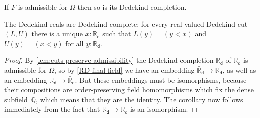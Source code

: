 \documentclass[10pt,a4paper]{article}
\providecommand{\index}[1]{}
\newcommand{\Q}{\ensuremath{\mathbb{Q}}\xspace}
\newcommand{\RD}{\ensuremath{\mathbb{R}_\mathsf{d}}\xspace} %
\newcommand{\barRD}{\ensuremath{\bar{\mathbb{R}}_\mathsf{d}}\xspace} %
\theoremstyle{definition}
\theoremstyle{remark}
\numberwithin{equation}{section}
\newcommand{\indexdef}[1]{\index{#1|defstyle}}   %
\begin{document}
\begin{lem} \label{lem:cuts-preserve-admissibility}
  If $F$ is admissible for $\Omega$ then so is its Dedekind completion.
  \index{completion!Dedekind}%
\end{lem}

\begin{cor} \label{RD-dedekind-complete}
  \indexdef{complete!ordered field, Dedekind}%
  \indexdef{Dedekind!completeness}%
  The Dedekind reals are Dedekind complete: for every real-valued Dedekind cut $(L, U)$
  there is a unique $x : \RD$ such that $L(y) = (y < x)$ and $U(y) = (x < y)$ for all $y :
  \RD$.
\end{cor}

\begin{proof}
  By \cref{lem:cuts-preserve-admissibility} the Dedekind completion $\barRD$ of $\RD$
  is admissible for $\Omega$, so by \cref{RD-final-field} we have an embedding $\barRD
  \to \RD$, as well as an embedding $\RD \to \barRD$. But these embeddings must be
  isomorphisms, because their compositions are order-preserving field homomorphisms\index{homomorphism!field} which
  fix the dense subfield~$\Q$, which means that they are the identity. The corollary now
  follows immediately from the fact that $\barRD \to \RD$ is an isomorphism.
\end{proof}
\end{document}
